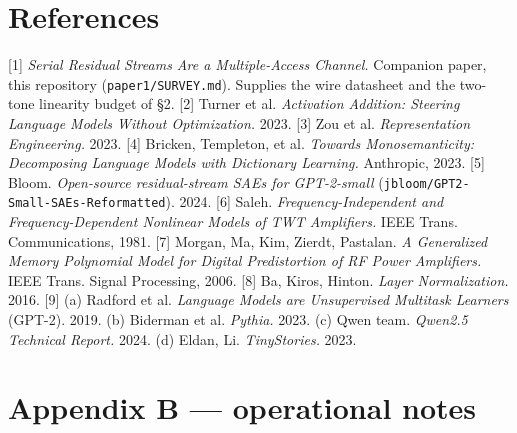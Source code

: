 \documentclass[10pt]{article}
\begin{document}
\section{References}

[1] \emph{Serial Residual Streams Are a Multiple-Access Channel.} Companion paper, this repository
(\texttt{paper1/SURVEY.md}). Supplies the wire datasheet and the two-tone linearity budget of §2.
[2] Turner et al. \emph{Activation Addition: Steering Language Models Without Optimization.} 2023.
[3] Zou et al. \emph{Representation Engineering.} 2023.
[4] Bricken, Templeton, et al. \emph{Towards Monosemanticity: Decomposing Language Models with Dictionary Learning.} Anthropic, 2023.
[5] Bloom. \emph{Open-source residual-stream SAEs for GPT-2-small} (\texttt{jbloom/GPT2-Small-SAEs-Reformatted}). 2024.
[6] Saleh. \emph{Frequency-Independent and Frequency-Dependent Nonlinear Models of TWT Amplifiers.} IEEE Trans. Communications, 1981.
[7] Morgan, Ma, Kim, Zierdt, Pastalan. \emph{A Generalized Memory Polynomial Model for Digital Predistortion of RF Power Amplifiers.} IEEE Trans. Signal Processing, 2006.
[8] Ba, Kiros, Hinton. \emph{Layer Normalization.} 2016.
[9] (a) Radford et al. \emph{Language Models are Unsupervised Multitask Learners} (GPT-2). 2019. (b) Biderman et al. \emph{Pythia.} 2023. (c) Qwen team. \emph{Qwen2.5 Technical Report.} 2024. (d) Eldan, Li. \emph{TinyStories.} 2023.

\section{Appendix B --- operational notes}
\end{document}
